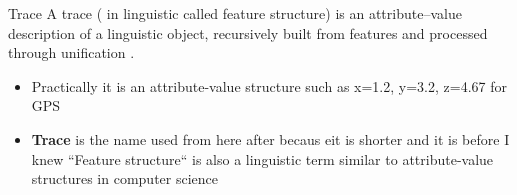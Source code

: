 \begin{frame}[allowframebreaks]{Trace}
    A trace ( in linguistic called \alert{feature structure}) is an attribute--value description of a linguistic object, recursively built from features and processed through unification \cite{kay-1984-functional-unification-grammar}.
    
    \begin{itemize}
        \item Practically it is an attribute-value structure such as {x=1.2, y=3.2, z=4.67} for GPS
        \item \textbf{Trace} is the name used from here after becaus eit is shorter and it is before I knew ``Feature structure`` is also a linguistic term similar to attribute-value structures in computer science
    \end{itemize}

\end{frame}